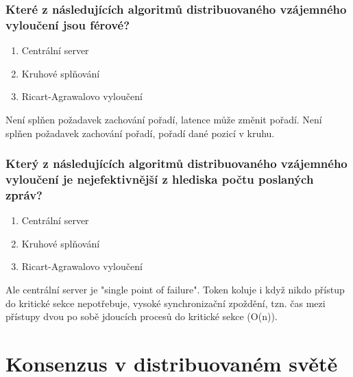 \documentclass[usenames,dvipsnames,9pt]{beamer}
\begin{document}
{
  \begin{frame}[fragile]
  \frametitle{Které z následujících algoritmů distribuovaného vzájemného vyloučení jsou férové?}
  \begin{enumerate}
  \item Centrální server 
  \item Kruhové splňování 
  \item Ricart-Agrawalovo vyloučení 
  \end{enumerate}
  \vspace{2em}
  \begin{overprint}[\textwidth]
     Není splňen požadavek zachování pořadí, latence může změnit pořadí.
     Není splňen požadavek zachování pořadí, pořadí dané pozicí v kruhu.
  \end{overprint}
  \end{frame}


  \begin{frame}[fragile]
  \frametitle{Který z následujících algoritmů distribuovaného vzájemného vyloučení je nejefektivnější z hlediska počtu poslaných zpráv?}
  \begin{enumerate}
    \item Centrální server 
    \item Kruhové splňování 
    \item Ricart-Agrawalovo vyloučení 
  \end{enumerate}
  \vspace{2em}
  \begin{overprint}[\textwidth]
     Ale centrální server je "single point of failure".
     Token koluje i když nikdo přístup do kritické sekce nepotřebuje, vysoké synchronizační zpoždění, tzn. čas mezi přístupy dvou po sobě jdoucích procesů do kritické sekce (O(n)).
  \end{overprint}
  \end{frame}

}

\section{Konsenzus v distribuovaném světě}
\end{document}
